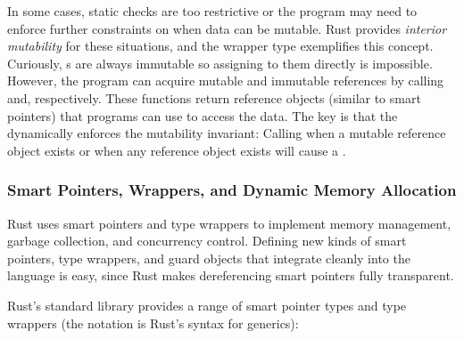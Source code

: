 In some cases, static checks are too restrictive or the program may need to
enforce further constraints on when data can be mutable.  Rust provides
\emph{interior mutability} for these situations, and the wrapper type
 exemplifies this concept.  Curiously, s are always
immutable so assigning to them directly is impossible.  However, the program
can acquire mutable and immutable references by calling
 and\linebreak{}, respectively.  These
functions return reference objects (similar to smart pointers) that programs
can use to access the data.  The key is that the 
dynamically enforces the mutability invariant: Calling  when a
mutable reference object exists or  when any reference object
exists will cause a .



\subsubsection{Smart Pointers, Wrappers, and Dynamic Memory Allocation}
\label{sec:wrapper}

Rust uses smart pointers and type wrappers to implement memory management,
garbage collection, and concurrency control.  Defining new kinds of smart
pointers, type wrappers, and guard objects that integrate cleanly into the language is easy,
since Rust makes dereferencing smart pointers fully transparent.

Rust's standard library provides a range of smart pointer types and type
wrappers (the \csym{<>} notation is Rust's syntax for generics):


